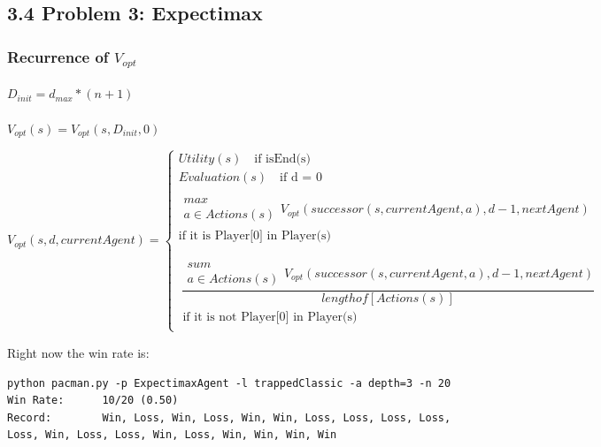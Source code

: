 \documentclass[12pt]{article}
\begin{document}
\subsection{3.4 Problem 3: Expectimax  }
\subsubsection{Recurrence of $V_{opt}$}
\paragraph{}
\paragraph{}

$D_{init} = d_{max} * (n+1) $
\paragraph{}
$V_{opt}(s) = V_{opt}(s, D_{init}, 0)$


\[ V_{opt}(s, d, currentAgent) = 
\begin{cases} 
Utility(s)   \quad \text{if isEnd(s)}\\
Evaluation(s) \quad \text{if d = 0}  \\ \\
\substack{max \\a \in Actions(s)} V_{opt}(successor(s, currentAgent, a), d - 1, nextAgent) \\ \text{if it is Player[0] in Player(s)} \\ \\
\\
\ \dfrac{\substack{sum \\a \in Actions(s)} V_{opt}(successor(s,currentAgent, a), d - 1, nextAgent)}{length of [Actions(s)]} \\ \text{ if it is not Player[0] in Player(s)} \\
\end{cases}
\]


Right now the win rate is:
\begin{lstlisting}	
python pacman.py -p ExpectimaxAgent -l trappedClassic -a depth=3 -n 20
Win Rate:      10/20 (0.50)
Record:        Win, Loss, Win, Loss, Win, Win, Loss, Loss, Loss, Loss, Loss, Win, Loss, Loss, Win, Loss, Win, Win, Win, Win


\end{lstlisting}
\end{document}
